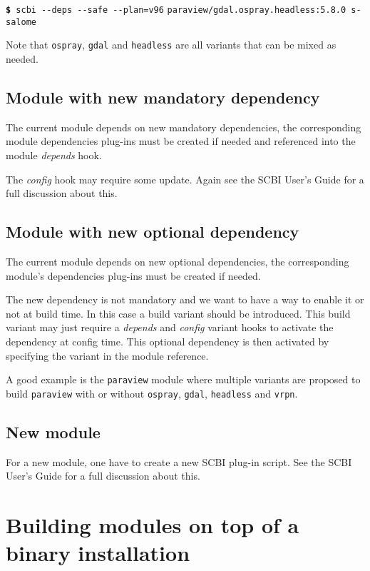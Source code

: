 \documentclass[a4paper,12pt,twoside]{article}
\newcommand{\code}[1]{\texttt{#1}}
\renewcommand{\emph}[1]{\textit{#1}}
\newcommand{\cmd}[1]{\tabto{1cm}\hspace{0.5cm}\texttt{\textbf{\$} #1}}
\newcommand{\cmdc}[1]{\tabto{1cm}\hspace{1.5cm}\texttt{#1}}
\newcommand{\ddash}{-{}-}
\let\stdsection\section
\renewcommand\section{\newpage\stdsection}
\begin{document}
\cmd{scbi \ddash{}deps \ddash{}safe \ddash{}plan=v96}
\cmdc{paraview/gdal.ospray.headless:5.8.0 s-salome}

Note that \code{ospray}, \code{gdal} and \code{headless} are all variants that can be mixed as needed.

\subsection{Module with new mandatory dependency}

The current module depends on new mandatory dependencies, the corresponding module dependencies plug-ins must be created if needed and referenced into the module \emph{depends} hook.

The \emph{config} hook may require some update. Again see the SCBI User's Guide for a full discussion about this.

\subsection{Module with new optional dependency}

The current module depends on new optional dependencies, the corresponding module's dependencies plug-ins must be created if needed.

The new dependency is not mandatory and we want to have a way to enable it or not at build time. In this case a build variant should be introduced. This build variant may just require a \emph{depends} and \emph{config} variant hooks to activate the dependency at config time. This optional dependency is then activated by specifying the variant in the module reference.

A good example is the \code{paraview} module where multiple variants are proposed to build \code{paraview} with or without \code{ospray}, \code{gdal}, \code{headless} and \code{vrpn}.

\subsection{New module}

For a new module, one have to create a new SCBI plug-in script. See the SCBI User's Guide for a full discussion about this.


\section{Building modules on top of a binary installation}
\end{document}
